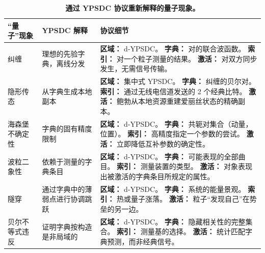 \documentclass[12pt,a4paper]{article}
\theoremstyle{remark}
\begin{document}
	\begin{table}[htbp]
		\centering
		\caption{\normalsize\textbf{通过 YPSDC 协议重新解释的量子现象。}}
		\label{tab:quantum-ypsdc}
		\small
		\begin{tabular}{p{2.8cm} p{4.8cm} p{7.8cm}}
			\toprule
			\textbf{“量子”现象} &
			\textbf{YPSDC 解释} &
			\textbf{协议细节} \\
			\midrule
			纠缠 &
			理想的先验字典，离线分发 &
			\textbf{区域：} d-YPSDC。 \newline
			\textbf{字典：} 对的联合波函数。 \newline
			\textbf{索引：} 对一个粒子测量的结果。 \newline
			\textbf{激活：} 对双方同步发生，无需信号传输。 \\
			\midrule
			隐形传态 &
			从字典生成本地副本 &
			\textbf{区域：} 集中式 YPSDC。 \newline
			\textbf{字典：} 纠缠的贝尔对。 \newline
			\textbf{索引：} 通过无线电信道发送的 2 个经典比特。 \newline
			\textbf{激活：} 鲍勃从本地资源重建爱丽丝状态的精确副本。 \\
			\midrule
			海森堡不确定性 &
			字典的固有精度限制 &
			\textbf{区域：} d-YPSDC。 \newline
			\textbf{字典：} 共轭对集合（动量，位置）。 \newline
			\textbf{索引：} 高精度指定一个参数的尝试。 \newline
			\textbf{激活：} 立即降低互补参数的确定性。 \\
			\midrule
			波粒二象性 &
			依赖于测量的字典条目 &
			\textbf{区域：} d-YPSDC。 \newline
			\textbf{字典：} 可能表现的全部曲目。 \newline
			\textbf{索引：} 测量装置的类型。 \newline
			\textbf{激活：} 对象表现出被激活的字典条目所规定的属性。 \\
			\midrule
			隧穿 &
			通过字典中的薄弱点进行协调跳跃 &
			\textbf{区域：} d-YPSDC。 \newline
			\textbf{字典：} 系统的能量景观。 \newline
			\textbf{索引：} 热或量子涨落。 \newline
			\textbf{激活：} 粒子“发现自己”在势垒的另一边。 \\
			\midrule
			贝尔不等式违反 &
			证明字典按构造是非局域的 &
			\textbf{区域：} d-YPSDC。 \newline
			\textbf{字典：} 隐藏相关性的完整集合。 \newline
			\textbf{索引：} 测量基的选择。 \newline
			\textbf{激活：} 统计匹配字典预测，而非经典信号。 \\
			\bottomrule
		\end{tabular}
	\end{table}
	
\end{document}
